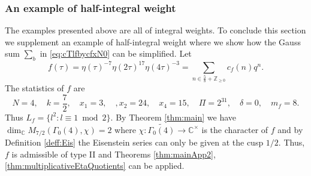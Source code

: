 \documentclass[12pt]{amsart}
\numberwithin{equation}{section}
\theoremstyle{plain}
\theoremstyle{definition}
\theoremstyle{remark}
\newcommand\numC{\mathbb{C}}
\newcommand\numgeq[2]{\mathbb{#1}_{\geq #2}}
\begin{document}
\subsubsection{An example of half-integral weight} The examples presented above are all of integral weights. To conclude this section we supplement an example of half-integral weight where we show how the Gauss sum $\sum_b$ in \eqref{eq:cTlfbycfxN0} can be simplified. Let
\begin{equation}
\label{eq:N4halfintegralExamp}
f(\tau)=\eta(\tau)^{-7}\eta(2\tau)^{17}\eta(4\tau)^{-3}=\sum_{n\in\frac{5}{8}+\numgeq{Z}{0}}c_f(n)q^n.
\end{equation}
The statistics of $f$ are
\begin{equation*}
N=4,\quad k=\frac{7}{2},\quad x_1=3,\quad,x_2=24,\quad x_4=15,\quad\varPi=2^{31},\quad\delta=0,\quad m_f=8.
\end{equation*}
Thus $L_f=\{l^2\colon l\equiv1\bmod{2}\}$. By Theorem \ref{thm:main} we have $\dim_\numC M_{7/2}(\Gamma_0(4),\chi)=2$ where $\chi\colon\widetilde{\Gamma_0(4)}\rightarrow\numC^\times$ is the character of $f$ and by Definition \ref{deff:Eis} the Eisenstein series can only be given at the cusp $1/2$. Thus, $f$ is admissible of type II and Theorems \ref{thm:mainApp2}, \ref{thm:multiplicativeEtaQuotients} can be applied.
\end{document}
